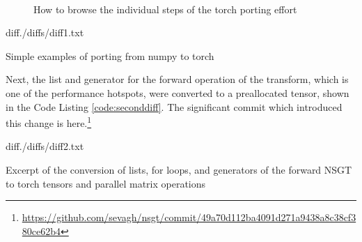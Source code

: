 \documentclass[report.tex]{subfiles}
\begin{document}
\begin{figure}[!ht]
	\centering
	\\
	\caption{How to browse the individual steps of the torch porting effort}
	\label{fig:ghcommitbrowser}
\end{figure}

\begin{listing}[ht]
  \centering
\begin{inputminted}[linenos,breaklines,frame=single,fontsize=\scriptsize]{diff}{./diffs/diff1.txt}
\end{inputminted}
  \caption{Simple examples of porting from numpy to torch}
  \label{code:firstdiff}
\end{listing}

Next, the list and generator for the forward operation of the transform, which is one of the performance hotspots, were converted to a preallocated tensor, shown in the Code Listing \ref{code:seconddiff}. The significant commit which introduced this change is here.\footnote{\url{https://github.com/sevagh/nsgt/commit/49a70d112ba4091d271a9438a8c38cf380ce62b4}}

\begin{listing}[ht]
  \centering
\begin{inputminted}[linenos,breaklines,frame=single,fontsize=\scriptsize]{diff}{./diffs/diff2.txt}
\end{inputminted}
  \caption{Excerpt of the conversion of lists, for loops, and generators of the forward NSGT to torch tensors and parallel matrix operations}
  \label{code:seconddiff}
\end{listing}
\end{document}
